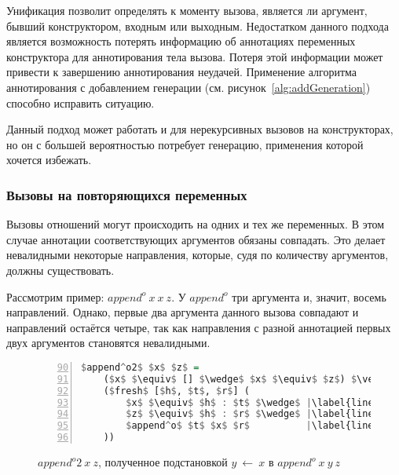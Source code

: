 Унификация позволит определять к моменту вызова, является ли аргумент, бывший конструктором, входным или выходным.
Недостатком данного подхода является возможность потерять информацию об аннотациях переменных конструктора для аннотирования тела вызова.
Потеря этой информации может привести к завершению аннотирования неудачей.
Применение алгоритма аннотирования с добавлением генерации (см. рисунок~\ref{alg:addGeneration}) способно исправить ситуацию.

Данный подход может работать и для нерекурсивных вызовов на конструкторах, но он с большей вероятностью потребует генерацию, применения которой хочется избежать.


\subsubsection{Вызовы на повторяющихся переменных}

Вызовы отношений могут происходить на одних и тех же переменных.
В этом случае аннотации соответствующих аргументов обязаны совпадать.
Это делает невалидными некоторые направления, которые, судя по количеству аргументов, должны существовать.

Рассмотрим пример: $append^o~x~x~z$.
У $append^o$ три аргумента и, значит, восемь направлений.
Однако, первые два аргумента данного вызова совпадают и направлений остаётся четыре, так как направления с разной аннотацией первых двух аргументов становятся невалидными.

\begin{figure}[h!]
  \begin{center}
  \begin{minipage}{0.35\textwidth}
  \begin{lstlisting}[language=Haskell, frame=single, numbers=left,numberstyle=\small, firstnumber=90, escapechar=|]
  $append^o2$ $x$ $z$ =
    ($x$ $\equiv$ [] $\wedge$ $x$ $\equiv$ $z$) $\vee$ |\label{line:appendo22}|
    ($fresh$ [$h$, $t$, $r$] (
        $x$ $\equiv$ $h$ : $t$ $\wedge$ |\label{line:appendo24}|
        $z$ $\equiv$ $h$ : $r$ $\wedge$ |\label{line:appendo25}|
        $append^o$ $t$ $x$ $r$          |\label{line:appendo26}|
    ))
    \end{lstlisting}
  \end{minipage}
  \end{center}
  \caption{$append^o2 \ x \ z$, полученное подстановкой $y~\gets~x$ в $append^o \ x \ y \ z$}
  \label{lst:appendo2}
\end{figure}

